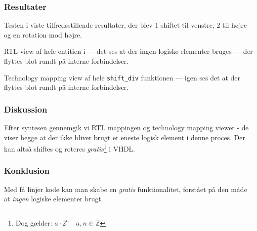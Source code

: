 \subsubsection{Resultater}
Testen i  viste tilfredsstillende resultater, der blev 1 shiftet til venstre, 2 til højre og en rotation mod højre.

{RTL view af hele entitien i  --- det ses at der ingen logiske elementer bruges --- der flyttes blot rundt på interne forbindelser.}


{Technology mapping view af hele \texttt{shift\_div} funktionen --- igen ses det at der flyttes blot rundt på interne forbindelser.}




\subsubsection{Diskussion}
Efter syntesen gennemgik vi RTL mappingen og technology mapping viewet - de viser begge at der ikke bliver brugt et eneste logisk element i denne proces. Der kan altså shiftes og roteres \emph{gratis}\footnote{Dog gælder: $a\cdot 2^n \quad a, n \in \mathbb{Z}$} i VHDL.

\subsubsection{Konklusion}

Med få linjer kode kan man skabe en \emph{gratis} funktionalitet, forstået på den måde at \textit{ingen} logiske elementer brugt.

